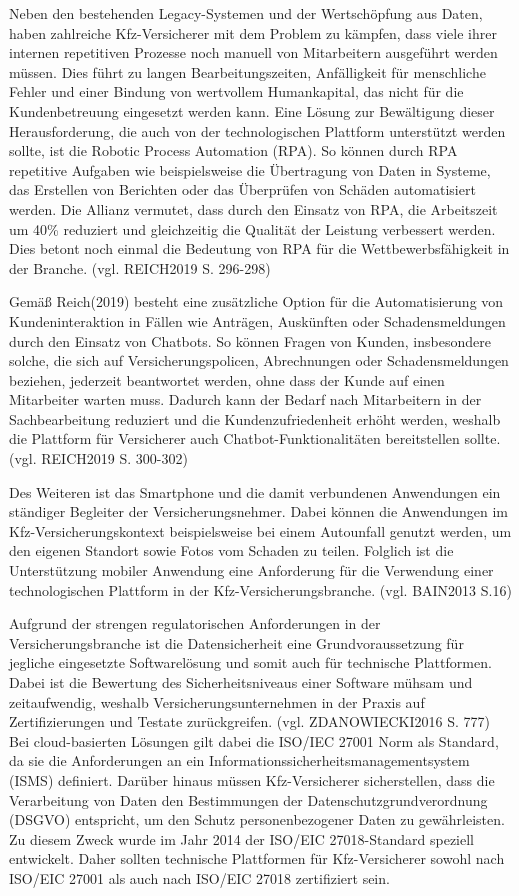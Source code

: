 Neben den bestehenden Legacy-Systemen und der Wertschöpfung aus Daten, haben zahlreiche Kfz-Versicherer mit dem Problem zu kämpfen, dass viele ihrer internen repetitiven Prozesse noch manuell von Mitarbeitern ausgeführt werden müssen. Dies führt zu langen Bearbeitungszeiten, Anfälligkeit für menschliche Fehler und einer Bindung von wertvollem Humankapital, das nicht für die Kundenbetreuung eingesetzt werden kann. Eine Lösung zur Bewältigung dieser Herausforderung, die auch von der technologischen Plattform unterstützt werden sollte, ist die Robotic Process Automation (RPA). So können durch RPA repetitive Aufgaben wie beispielsweise die Übertragung von Daten in Systeme, das Erstellen von Berichten oder das Überprüfen von Schäden automatisiert werden. Die Allianz vermutet, dass durch den Einsatz von RPA, die Arbeitszeit um 40\% reduziert und gleichzeitig die Qualität der Leistung verbessert werden. Dies betont noch einmal die Bedeutung von RPA für die Wettbewerbsfähigkeit in der Branche. (vgl. REICH2019 S. 296-298)

Gemäß Reich(2019) besteht eine zusätzliche Option für die Automatisierung von Kundeninteraktion in Fällen wie Anträgen, Auskünften oder Schadensmeldungen durch den Einsatz von Chatbots. So können Fragen von Kunden, insbesondere solche, die sich auf Versicherungspolicen, Abrechnungen oder Schadensmeldungen beziehen, jederzeit beantwortet werden, ohne dass der Kunde auf einen Mitarbeiter warten muss. Dadurch kann der Bedarf nach Mitarbeitern in der Sachbearbeitung reduziert und die Kundenzufriedenheit erhöht werden, weshalb die Plattform für Versicherer auch Chatbot-Funktionalitäten bereitstellen sollte. (vgl. REICH2019 S. 300-302)

Des Weiteren ist das Smartphone und die damit verbundenen Anwendungen ein ständiger Begleiter der Versicherungsnehmer. Dabei können die Anwendungen im Kfz-Versicherungskontext beispielsweise bei einem Autounfall genutzt werden, um den eigenen Standort sowie Fotos vom Schaden zu teilen. Folglich ist die Unterstützung mobiler Anwendung eine Anforderung für die Verwendung einer technologischen Plattform in der Kfz-Versicherungsbranche. (vgl. BAIN2013 S.16)

Aufgrund der strengen regulatorischen Anforderungen in der Versicherungsbranche ist die Datensicherheit eine Grundvoraussetzung für jegliche eingesetzte Softwarelösung und somit auch für technische Plattformen. Dabei ist die Bewertung des Sicherheitsniveaus einer Software mühsam und zeitaufwendig, weshalb Versicherungsunternehmen in der Praxis auf Zertifizierungen und Testate zurückgreifen. (vgl. ZDANOWIECKI2016 S. 777) Bei cloud-basierten Lösungen gilt dabei die ISO/IEC 27001 Norm als  Standard, da sie die Anforderungen an ein Informationssicherheitsmanagementsystem (ISMS) definiert. Darüber hinaus müssen Kfz-Versicherer sicherstellen, dass die Verarbeitung von Daten den Bestimmungen der Datenschutzgrundverordnung (DSGVO) entspricht, um den Schutz personenbezogener Daten zu gewährleisten. Zu diesem Zweck wurde im Jahr 2014 der ISO/EIC 27018-Standard speziell entwickelt. Daher sollten technische Plattformen für Kfz-Versicherer sowohl nach ISO/EIC 27001 als auch nach ISO/EIC 27018 zertifiziert sein.


